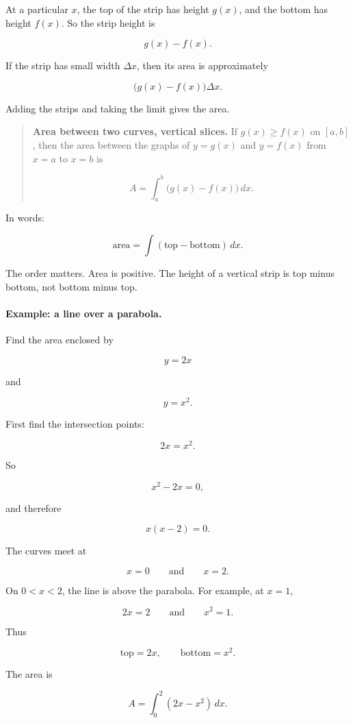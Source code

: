 At a particular \(x\), the top of the strip has height \(g(x)\), and the bottom has height
\(f(x)\).  So the strip height is

\[
g(x)-f(x).
\]

If the strip has small width \(\Delta x\), then its area is approximately

\[
\bigl(g(x)-f(x)\bigr)\Delta x.
\]

Adding the strips and taking the limit gives the area.

\begin{quote}
\textbf{Area between two curves, vertical slices.}
If \(g(x)\ge f(x)\) on \([a,b]\), then the area between the graphs of \(y=g(x)\) and
\(y=f(x)\) from \(x=a\) to \(x=b\) is

\[
\boxed{
A=\int_a^b \bigl(g(x)-f(x)\bigr)\,dx.
}
\]
\end{quote}

In words:

\[
\boxed{
\text{area}=\int(\text{top}-\text{bottom})\,dx.
}
\]

The order matters.  Area is positive.  The height of a vertical strip is top minus bottom,
not bottom minus top.

\paragraph{Example: a line over a parabola.}
Find the area enclosed by

\[
y=2x
\]

and

\[
y=x^2.
\]

First find the intersection points:

\[
2x=x^2.
\]

So

\[
x^2-2x=0,
\]

and therefore

\[
x(x-2)=0.
\]

The curves meet at

\[
x=0
\qquad\text{and}\qquad
x=2.
\]

On \(0<x<2\), the line is above the parabola.  For example, at \(x=1\),

\[
2x=2
\qquad\text{and}\qquad
x^2=1.
\]

Thus

\[
\text{top}=2x,
\qquad
\text{bottom}=x^2.
\]

The area is

\[
A=\int_0^2 (2x-x^2)\,dx.
\]


